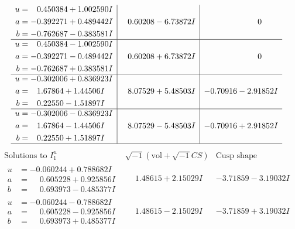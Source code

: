 \documentclass[1p]{elsarticle_modified}
\theoremstyle{definition}
\newcommand{\I}{\sqrt{-1}}
\begin{document}
$$\begin{array}{c|c|c}
\begin{aligned}
u &= \phantom{-}0.450384 + 1.002590 I \\
a &= -0.392271 + 0.489442 I \\
b &= -0.762687 - 0.383581 I\end{aligned}
 & \phantom{-}0.60208 - 6.73872 I & \phantom{-0.000000 } 0 \\ \hline\begin{aligned}
u &= \phantom{-}0.450384 - 1.002590 I \\
a &= -0.392271 - 0.489442 I \\
b &= -0.762687 + 0.383581 I\end{aligned}
 & \phantom{-}0.60208 + 6.73872 I & \phantom{-0.000000 } 0 \\ \hline\begin{aligned}
u &= -0.302006 + 0.836923 I \\
a &= \phantom{-}1.67864 + 1.44506 I \\
b &= \phantom{-}0.22550 - 1.51897 I\end{aligned}
 & \phantom{-}8.07529 + 5.48503 I & -0.70916 - 2.91852 I \\ \hline\begin{aligned}
u &= -0.302006 - 0.836923 I \\
a &= \phantom{-}1.67864 - 1.44506 I \\
b &= \phantom{-}0.22550 + 1.51897 I\end{aligned}
 & \phantom{-}8.07529 - 5.48503 I & -0.70916 + 2.91852 I\\
 \hline 
 \end{array}$$\newpage$$\begin{array}{c|c|c}  
\text{Solutions to }I^u_{1}& \I (\text{vol} + \sqrt{-1}CS) & \text{Cusp shape}\\
 \hline 
\begin{aligned}
u &= -0.060244 + 0.788682 I \\
a &= \phantom{-}0.605228 + 0.925856 I \\
b &= \phantom{-}0.693973 - 0.485377 I\end{aligned}
 & \phantom{-}1.48615 + 2.15029 I & -3.71859 - 3.19032 I \\ \hline\begin{aligned}
u &= -0.060244 - 0.788682 I \\
a &= \phantom{-}0.605228 - 0.925856 I \\
b &= \phantom{-}0.693973 + 0.485377 I\end{aligned}
 & \phantom{-}1.48615 - 2.15029 I & -3.71859 + 3.19032 I \\ \hline\begin{aligned}

\end{aligned}
\end{array}$$
\end{document}
